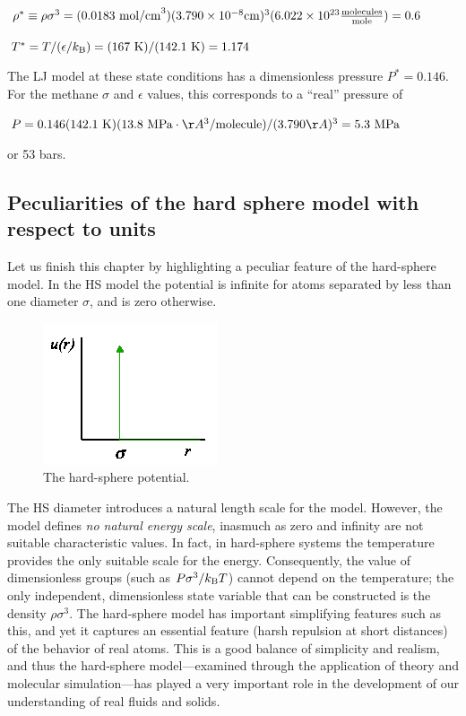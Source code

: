 \documentclass[9pt,bestpractices]{molsim}
\begin{document}
$\rho^* \equiv \rho\sigma^3 = (0.0183~{\rm mol/cm}^3)(3.790 \times
10^{-8} {\rm cm})^3(6.022 \times 10^{23} \frac{{\rm molecules}}{{\rm mole}}) = 0.6$

$T^* = T/(\epsilon/k_{\rm B}) = (167~{\rm K})/(142.1~{\rm K}) = 1.174$

The LJ model at these state conditions has a dimensionless pressure $P^* =
0.146$. For the methane $\sigma$ and $\epsilon$ values, this corresponds to a ``real''
pressure of

$P = 0.146 (142.1~{\rm K})(13.8~{\rm MPa}\cdot\AA^{3}/{\rm molecule})/(3.790\AA)^{3} = 5.3~{\rm MPa}$

or 53 bars.

\subsection{Peculiarities of the hard sphere model with respect to units} 

Let us finish this chapter by highlighting a peculiar feature of the
hard-sphere model. In the HS model the potential is infinite for atoms
separated by less than one diameter $\sigma$, and is zero otherwise.

\begin{figure}
  \centering
  \includegraphics[width=5 cm]{SimElements_figures/image001}
  \caption{\label{fig:HS} The hard-sphere potential.}
\end{figure}

The HS diameter introduces a natural length scale for the model.
However, the model defines \emph{no natural energy scale}, inasmuch as
zero and infinity are not suitable characteristic values. In fact, in
hard-sphere systems the temperature provides the only suitable scale for
the energy. Consequently, the value of dimensionless groups (such as
$P\sigma^3/k_{\rm B}T$) cannot depend on the temperature; the only
independent, dimensionless state variable that can be constructed is the
density $\rho\sigma^3$. The hard-sphere model has important
simplifying features such as this, and yet it captures an essential
feature (harsh repulsion at short distances) of the behavior of real
atoms. This is a good balance of simplicity and realism, and thus the
hard-sphere model---examined through the application of theory and
molecular simulation---has played a very important role in the
development of our understanding of real fluids and solids.


\end{document}
